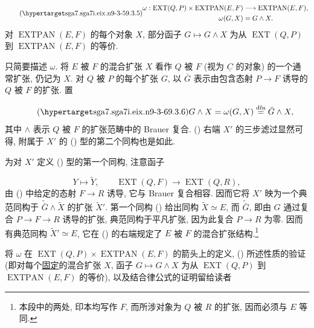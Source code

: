 \begin{equation}\tag{\SGARefTarget{sga7.sga7i.eix.n9-3-5}{9.3.5}}
\begin{aligned}
\omega:
\operatorname{EXT}(Q,P)\times\operatorname{EXTPAN}(E,F)
 &\longrightarrow \operatorname{EXTPAN}(E,F),\\
\omega(G,X)&=G\wedge X.
\end{aligned}
\end{equation}
对 $\operatorname{EXTPAN}(E,F)$ 的每个对象 $X$, 部分函子 $G\longmapsto G\wedge X$ 为从 $\operatorname{EXT}(Q,P)$ 到 $\operatorname{EXTPAN}(E,F)$ 的等价.

只简要描述 $\omega$. 将 $E$ 被 $F$ 的混合扩张 $X$ 看作 $Q$ 被 $F$ (视为 $\underline C$ 的对象) 的一个通常扩张, 仍记为 $X$. 对 $Q$ 被 $P$ 的每个扩张 $G$, 以 $\bar G$ 表示由包含态射 $P\longrightarrow F$ 诱导的 $Q$ 被 $F$ 的扩张. 置

\begin{equation}\tag{\SGARefTarget{sga7.sga7i.eix.n9-3-6}{9.3.6}}
G\wedge X=\omega(G,X)
 \overset{\mathrm{dfn}}{=}\bar G\wedge X,
\end{equation}
其中 $\wedge$ 表示 $Q$ 被 $F$ 的扩张范畴中的 Brauer 复合. () 右端 $X'$ 的三步滤过显然可得, 附属于 $X'$ 的 () 型的第二个同构也是如此.

为对 $X'$ 定义 () 型的第一个同构, 注意函子

\begin{equation*}
Y\longmapsto\widetilde Y,
\qquad
\operatorname{EXT}(Q,F)\longrightarrow\operatorname{EXT}(Q,R),
\end{equation*}
由 () 中给定的态射 $F\longrightarrow R$ 诱导, 它与 Brauer 复合相容. 因而它将 $X'$ 映为一个典范同构于 $\widetilde{\bar G}\wedge\widetilde X$ 的扩张 $\widetilde X'$. 第一个同构 () 给出同构 $\widetilde X\simeq E$, 而 $\widetilde{\bar G}$, 即由 $G$ 通过复合 $P\longrightarrow F\longrightarrow R$ 诱导的扩张, 典范同构于平凡扩张, 因为此复合 $P\longrightarrow R$ 为零. 因而有典范同构 $\widetilde X'\simeq E$, 它在 () 的右端规定了 $E$ 被 $F$ 的混合扩张结构.\footnote{本段中的两处, 印本均写作 $F$, 而所涉对象为 $Q$ 被 $R$ 的扩张, 因而必须与 $E$ 等同.}

将 $\omega$ 在 $\operatorname{EXT}(Q,P)\times\operatorname{EXTPAN}(E,F)$ 的箭头上的定义, () 所述性质的验证 (即对每个\underline{固定}的混合扩张 $X$, 函子 $G\longmapsto G\wedge X$ 为从 $\operatorname{EXT}(Q,P)$ 到 $\operatorname{EXTPAN}(E,F)$ 的等价), 以及结合律公式的证明留给读者

